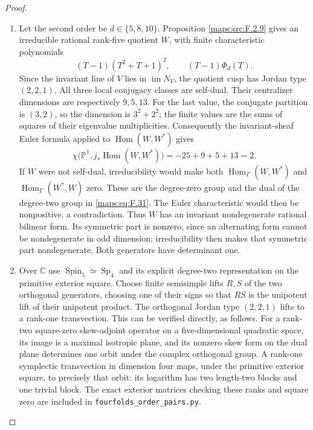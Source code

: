 \documentclass[11pt,a4paper]{article}
\theoremstyle{definition}
\begin{document}
\begin{proof}
\begin{enumerate}[label=\arabic*.]
\item Let the second order be $d\in\{5,8,10\}$.
Proposition \ref{maps:src:F.2.9} gives an irreducible rational rank-five
quotient $W$, with finite characteristic polynomials
\[
 (T-1)(T^2+T+1)^2,
 \qquad (T-1)\Phi_d(T).
\]
Since the invariant line of $V$ lies in $\operatorname{im}N_V$,
the quotient cusp has Jordan type $(2,2,1)$.
All three local conjugacy classes are self-dual.  Their
centralizer dimensions are respectively $9,5,13$.
For the last value, the conjugate partition is $(3,2)$,
so the dimension is $3^2+2^2$; the finite values are the
sums of squares of their eigenvalue multiplicities.
Consequently the invariant-sheaf Euler formula applied to
$\operatorname{Hom}(W,W^*)$ gives
\[
 \chi\bigl(\mathbb P^1,j_*\operatorname{Hom}(W,W^*)\bigr)
      =-25+9+5+13=2.
 \tag{F.31}\label{maps:eq:F.31}
\]
If $W$ were not self-dual, irreducibility would make both
$\operatorname{Hom}_\Gamma(W,W^*)$ and
$\operatorname{Hom}_\Gamma(W^*,W)$ zero.  These are the
degree-zero group and the dual of the degree-two group in
\eqref{maps:eq:F.31}.  The Euler characteristic would then be nonpositive,
a contradiction.  Thus $W$ has an invariant nondegenerate
rational bilinear form.  Its symmetric part is nonzero,
since an alternating form cannot be nondegenerate in odd
dimension; irreducibility then makes that symmetric part
nondegenerate.  Both generators have determinant one.

\item Over $\mathbb C$ use
$\operatorname{Spin}_5\simeq\operatorname{Sp}_4$ and its
explicit degree-two representation on the primitive exterior
square.  Choose finite semisimple lifts $R,S$ of the two
orthogonal generators, choosing one of their signs so that
$RS$ is the unipotent lift of their unipotent product.
The orthogonal Jordan type $(2,2,1)$ lifts to a rank-one
transvection.  This can be verified directly, as follows.
For a rank-two square-zero skew-adjoint operator on a
five-dimensional quadratic space, its image is a maximal
isotropic plane, and its nonzero skew form on the dual plane
determines one orbit under the complex orthogonal group.
A rank-one symplectic transvection in dimension four maps,
under the primitive exterior square, to precisely that orbit:
its logarithm has two length-two blocks and one trivial block.
The exact exterior matrices checking these ranks and square
zero are included in \texttt{fourfolds\_order\_pairs.py}.


\end{enumerate}
\end{proof}
\end{document}
